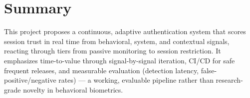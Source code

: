 \documentclass[11pt,a4paper]{article}
\begin{document}
\section{Summary}
This project proposes a continuous, adaptive authentication system
that scores session trust in real time from behavioral, system, and
contextual signals, reacting through tiers from passive monitoring to
session restriction. It emphasizes time-to-value through
signal-by-signal iteration, CI/CD for safe frequent releases, and
measurable evaluation (detection latency, false-positive/negative
rates) --- a working, evaluable pipeline rather than research-grade
novelty in behavioral biometrics.
\end{document}
